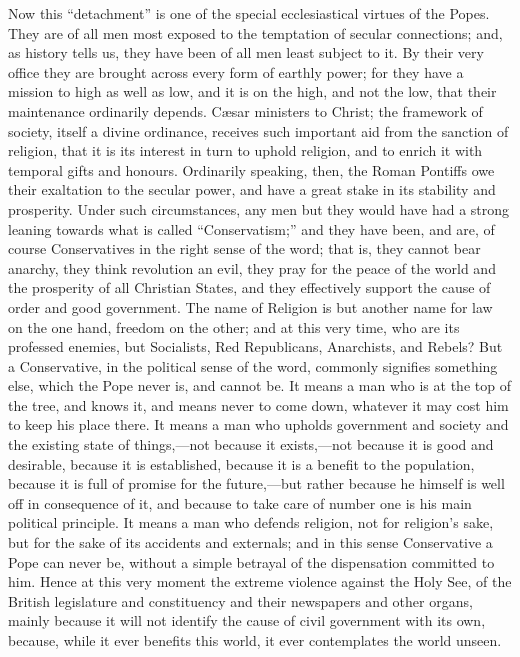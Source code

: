 Now this ``detachment'' is one of the special
ecclesiastical virtues of the Popes. They are of all men most exposed
to the temptation of secular connections; and, as history tells
us, they have been of all men least subject to it. By their very
office they are brought across every form of earthly power; for they
have a mission to high as well as low, and it is on the high, and not
the low, that their maintenance ordinarily depends. Cæsar ministers
to Christ; the framework of society, itself a divine ordinance,
receives such important aid from the sanction of religion, that it is
its interest in turn to uphold religion, and to enrich it with
temporal gifts and honours. Ordinarily speaking, then, the Roman
Pontiffs owe their exaltation to the secular power, and have a great
stake in its stability and prosperity. Under such circumstances, any
men but they would have had a strong leaning towards what is called
``Conservatism;'' and they have been, and are, of course
Conservatives in the right sense of the word; that is, they cannot
bear anarchy, they think revolution an evil, they pray for the peace
of the world and the prosperity of all Christian States, and they
effectively support the cause of order and good government. The name
of Religion is but another name for law on the one hand, freedom on
the other; and at this very time, who are its professed enemies, but
Socialists, Red Republicans, Anarchists, and Rebels? But a
Conservative, in the political sense of the word, commonly signifies
something else, which the Pope never is, and cannot be. It means a man
who is at the top of the tree, and knows it, and means never to come
down, whatever it may cost him to keep his place there. It means a man
who upholds government and society and the existing state of things,—not
because it exists,—not because it is good and desirable, because it
is established, because it is a benefit to the population, because it
is full of promise for the future,—but rather because he himself is
well off in consequence of it, and because to take care of number
one is his main political principle. It means a man who defends
religion, not for religion's sake, but for the sake of its accidents
and externals; and in this sense Conservative a Pope can never be,
without a simple betrayal of the dispensation committed to him. Hence
at this very moment the extreme violence against the Holy See, of the
British legislature and constituency and their newspapers and other
organs, mainly because it will not identify the cause of civil
government with its own, because, while it ever benefits this world,
it ever contemplates the world unseen.

